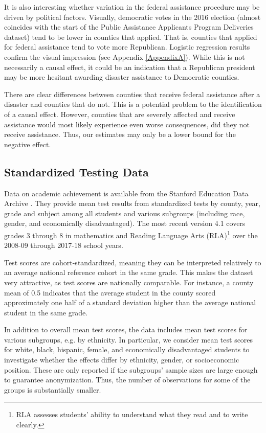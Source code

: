 It is also interesting whether variation in the federal assistance procedure may be driven by political factors. Visually, democratic votes in the 2016 election (almost coincides with the start of the Public Assistance Applicants Program Deliveries dataset) tend to be lower in counties that applied. That is, counties that applied for federal assistance tend to vote more Republican. Logistic regression results confirm the visual impression (see Appendix \ref{AppendixA}). While this is not necessarily a causal effect, it could be an indication that a Republican president may be more hesitant awarding disaster assistance to Democratic counties.

There are clear differences between counties that receive federal assistance after a disaster and counties that do not. This is a potential problem to the identification of a causal effect. However, counties that are severely affected and receive assistance would most likely experience even worse consequences, did they not receive assistance. Thus, our estimates may only be a lower bound for the negative effect.


\subsection{Standardized Testing Data}

Data on academic achievement is available from the Stanford Education Data Archive \citep{SEDA}. They provide mean test results from standardized tests by county, year, grade and subject among all students and various subgroups (including race, gender, and economically disadvantaged). The most recent version 4.1 covers grades 3 through 8 in mathematics and Reading Language Arts (RLA)\footnote{RLA assesses students' ability to understand what they read and to write clearly.} over the 2008-09 through 2017-18 school years.

Test scores are cohort-standardized, meaning they can be interpreted relatively to an average national reference cohort in the same grade. This makes the dataset very attractive, as test scores are nationally comparable. For instance, a county mean of 0.5 indicates that the average student in the county scored approximately one half of a standard deviation higher than the average national student in the same grade.

In addition to overall mean test scores, the data includes mean test scores for various subgroups, e.g. by ethnicity. In particular, we consider mean test scores for white, black, hispanic, female, and economically disadvantaged students to investigate whether the effects differ by ethnicity, gender, or socioeconomic position. These are only reported if the subgroups' sample sizes are large enough to guarantee anonymization. Thus, the number of observations for some of the groups is substantially smaller.

